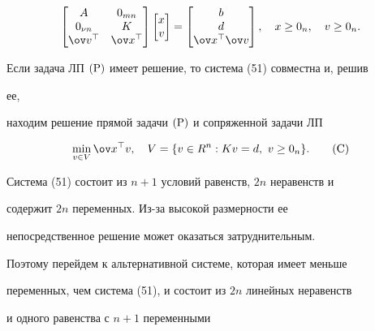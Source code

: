 \begin{equation}


\begin{bmatrix}


A & 0_{mn} \\ 0_{\nu n} & K \\ \ov v^\top & \ov x^\top


\end{bmatrix}


\begin{bmatrix}


x \\ v


\end{bmatrix}


=


\begin{bmatrix}


b \\ d \\ \ov x^\top\ov v


\end{bmatrix}


,\quad x\ge0_n,\quad v\ge 0_n.


\end{equation}





Если задача ЛП $(\mathrm P)$ имеет решение, то система (51) совместна и, решив 


ее,


находим решение прямой задачи $(\mathrm P)$ и сопряженной задачи ЛП


\begin{equation}


\min_{v\in V}\ov x^\top v,\quad V=\{v\in R^n:K v=d,\ v\ge0_n\}.


\tag{$\C$}


\end{equation}


Система (51) состоит из $n+1$ условий равенств, $2n$ неравенств и


содержит $2n$ переменных. Из-за высокой размерности ее


непосредственное решение может оказаться затруднительным.


Поэтому перейдем к альтернативной системе, которая имеет меньше


переменных, чем система (51), и состоит из $2n$ линейных неравенств


и одного равенства с $n+1$ переменными


